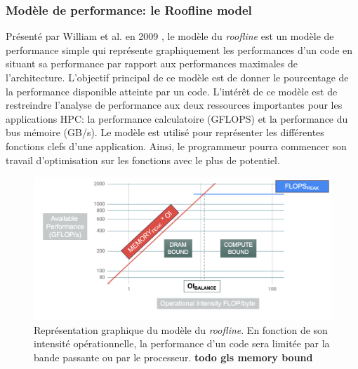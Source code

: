     \subsubsection{Modèle de performance: le Roofline model} \label{sec:roofline}
        
    
            Présenté par William et al. en 2009 \cite{Williams2008}, le modèle du \textit{roofline} est un modèle de performance simple qui représente graphiquement les performances d’un code en situant sa performance par rapport aux performances maximales de l’architecture. L’objectif principal de ce modèle est de donner le pourcentage de la performance disponible atteinte par un code. L’intérêt de ce modèle est de restreindre l’analyse de performance aux deux ressources importantes pour les applications HPC: la performance calculatoire (GFLOPS) et la performance du bus mémoire (GB/s).
            Le modèle est utilisé pour représenter les différentes fonctions clefs d’une application. Ainsi, le programmeur pourra commencer son travail d’optimisation sur les fonctions avec le plus de potentiel.
            
            \begin{figure}
                \center
                \includegraphics[width=12cm]{images/roofline.png}
                \caption{\label{fig:roofline} Représentation graphique du modèle du \textit{roofline}. En fonction de son intensité opérationnelle, la performance d'un code sera limitée par la bande passante ou par le processeur. \textbf{todo gls memory bound}}
            \end{figure}
            
